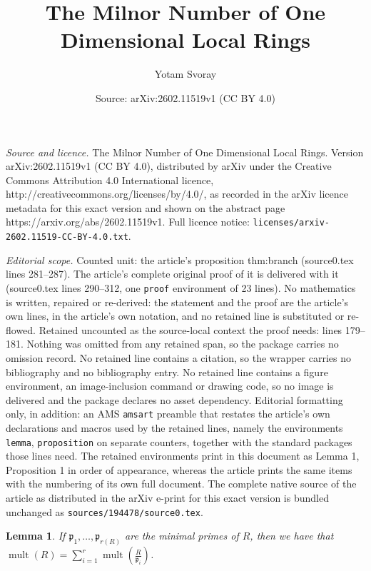 \documentclass[10pt,a4paper]{amsart}
\title{The Milnor Number of One Dimensional Local Rings}
\author{Yotam Svoray}
\date{Source: arXiv:2602.11519v1 (CC BY 4.0)}
\newtheorem{lemma}{Lemma}
\DeclareMathOperator{\mult}{mult}
\begin{document}
\maketitle

\noindent\emph{Source and licence.} The Milnor Number of One Dimensional Local Rings. Version arXiv:2602.11519v1 (CC BY 4.0), distributed by arXiv under the Creative Commons Attribution 4.0 International licence, http://creativecommons.org/licenses/by/4.0/, as recorded in the arXiv licence metadata for this exact version and shown on the abstract page https://arxiv.org/abs/2602.11519v1. Full licence notice: \texttt{licenses/arxiv-2602.11519-CC-BY-4.0.txt}.\par\smallskip

\noindent\textit{Editorial scope.} Counted unit: the article's proposition thm:branch (source0.tex lines 281--287). The article's complete original proof of it is delivered with it (source0.tex lines 290--312, one \texttt{proof} environment of 23 lines). No mathematics is written, repaired or re-derived: the statement and the proof are the article's own lines, in the article's own notation, and no retained line is substituted or re-flowed.  Retained uncounted as the source-local context the proof needs: lines 179--181.  Nothing was omitted from any retained span, so the package carries no omission record.  No retained line contains a citation, so the wrapper carries no bibliography and no bibliography entry.  No retained line contains a figure environment, an image-inclusion command or drawing code, so no image is delivered and the package declares no asset dependency.  Editorial formatting only, in addition: an AMS \texttt{amsart} preamble that restates the article's own declarations and macros used by the retained lines, namely the environments \texttt{lemma}, \texttt{proposition} on separate counters, together with the standard packages those lines need.  The retained environments print in this document as Lemma 1, Proposition 1 in order of appearance, whereas the article prints the same items with the numbering of its own full document.  The complete native source of the article as distributed in the arXiv e-print for this exact version is bundled unchanged as \texttt{sources/194478/source0.tex}.
\begin{lemma}\label{lem:mult_sum_prim}
    If $\mathfrak{p}_1, \dots, \mathfrak{p}_{r(R)}$ are the minimal primes of $R$, then we have that $\mult(R)=\sum_{i=1}^r \mult\left(\frac{R}{\mathfrak{p}_i}\right)$. 
\end{lemma}
\end{document}
